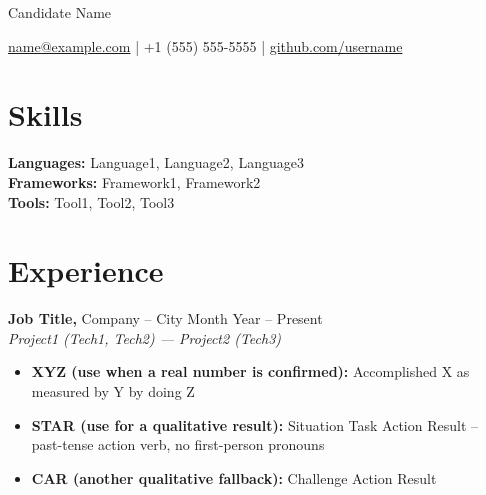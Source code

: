 \documentclass[11pt]{article}       %
\begin{document}
\centerline{\Huge Candidate Name}

\vspace{5pt}

\centerline{\href{mailto:name@example.com}{name@example.com} | +1 (555) 555-5555 | \href{https://github.com/username}{github.com/username}}

\vspace{-10pt}

%
%

\section*{Skills}
\textbf{Languages:} Language1, Language2, Language3 \\
\textbf{Frameworks:} Framework1, Framework2 \\
\textbf{Tools:} Tool1, Tool2, Tool3

\vspace{-6.5pt}

\section*{Experience}
\textbf{Job Title,} {Company} -- City \hfill Month Year -- Present \\
\textit{Project1 (Tech1, Tech2) --- Project2 (Tech3)} \\
\vspace{-9pt}
\begin{itemize}
  \item \textbf{XYZ (use when a real number is confirmed):} Accomplished X as measured by Y by doing Z
  \item \textbf{STAR (use for a qualitative result):} Situation Task Action Result -- past-tense action verb, no first-person pronouns
  \item \textbf{CAR (another qualitative fallback):} Challenge Action Result
\end{itemize}
\end{document}
